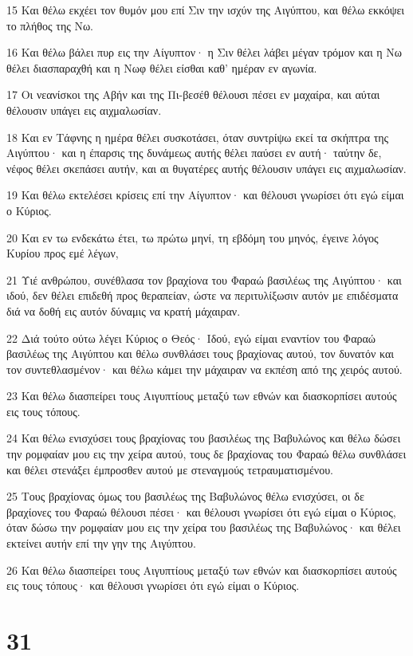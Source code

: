 \par 15 Και θέλω εκχέει τον θυμόν μου επί Σιν την ισχύν της Αιγύπτου, και θέλω εκκόψει το πλήθος της Νω.
\par 16 Και θέλω βάλει πυρ εις την Αίγυπτον· η Σιν θέλει λάβει μέγαν τρόμον και η Νω θέλει διασπαραχθή και η Νωφ θέλει είσθαι καθ' ημέραν εν αγωνία.
\par 17 Οι νεανίσκοι της Αβήν και της Πι-βεσέθ θέλουσι πέσει εν μαχαίρα, και αύται θέλουσιν υπάγει εις αιχμαλωσίαν.
\par 18 Και εν Τάφνης η ημέρα θέλει συσκοτάσει, όταν συντρίψω εκεί τα σκήπτρα της Αιγύπτου· και η έπαρσις της δυνάμεως αυτής θέλει παύσει εν αυτή· ταύτην δε, νέφος θέλει σκεπάσει αυτήν, και αι θυγατέρες αυτής θέλουσιν υπάγει εις αιχμαλωσίαν.
\par 19 Και θέλω εκτελέσει κρίσεις επί την Αίγυπτον· και θέλουσι γνωρίσει ότι εγώ είμαι ο Κύριος.
\par 20 Και εν τω ενδεκάτω έτει, τω πρώτω μηνί, τη εβδόμη του μηνός, έγεινε λόγος Κυρίου προς εμέ λέγων,
\par 21 Υιέ ανθρώπου, συνέθλασα τον βραχίονα του Φαραώ βασιλέως της Αιγύπτου· και ιδού, δεν θέλει επιδεθή προς θεραπείαν, ώστε να περιτυλίξωσιν αυτόν με επιδέσματα διά να δοθή εις αυτόν δύναμις να κρατή μάχαιραν.
\par 22 Διά τούτο ούτω λέγει Κύριος ο Θεός· Ιδού, εγώ είμαι εναντίον του Φαραώ βασιλέως της Αιγύπτου και θέλω συνθλάσει τους βραχίονας αυτού, τον δυνατόν και τον συντεθλασμένον· και θέλω κάμει την μάχαιραν να εκπέση από της χειρός αυτού.
\par 23 Και θέλω διασπείρει τους Αιγυπτίους μεταξύ των εθνών και διασκορπίσει αυτούς εις τους τόπους.
\par 24 Και θέλω ενισχύσει τους βραχίονας του βασιλέως της Βαβυλώνος και θέλω δώσει την ρομφαίαν μου εις την χείρα αυτού, τους δε βραχίονας του Φαραώ θέλω συνθλάσει και θέλει στενάξει έμπροσθεν αυτού με στεναγμούς τετραυματισμένου.
\par 25 Τους βραχίονας όμως του βασιλέως της Βαβυλώνος θέλω ενισχύσει, οι δε βραχίονες του Φαραώ θέλουσι πέσει· και θέλουσι γνωρίσει ότι εγώ είμαι ο Κύριος, όταν δώσω την ρομφαίαν μου εις την χείρα του βασιλέως της Βαβυλώνος· και θέλει εκτείνει αυτήν επί την γην της Αιγύπτου.
\par 26 Και θέλω διασπείρει τους Αιγυπτίους μεταξύ των εθνών και διασκορπίσει αυτούς εις τους τόπους· και θέλουσι γνωρίσει ότι εγώ είμαι ο Κύριος.

\chapter{31}

